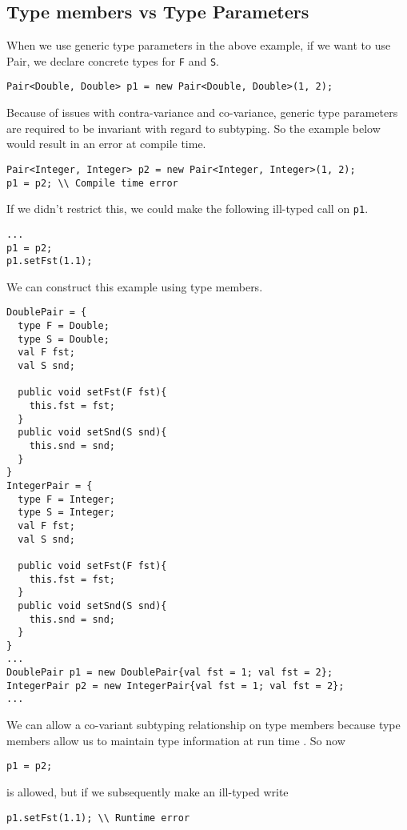 \documentclass{llncs}
\numberwithin{subcase}{casethm}
\numberwithin{casethm}{theorem}
\numberwithin{casethm}{lemma}
\begin{document}
\subsection{Type members vs Type Parameters}
When we use generic type parameters in the above example, 
if we want to use Pair, we declare  
concrete types for \texttt{F} and \texttt{S}.
\begin{lstlisting}[mathescape, style=custom_lang]
Pair<Double, Double> p1 = new Pair<Double, Double>(1, 2);
\end{lstlisting}
Because of issues with contra-variance and co-variance, 
generic type parameters are required to be invariant with 
regard to subtyping. So the example below would result in 
an error at compile time. 
\begin{lstlisting}[mathescape, style=custom_lang]
Pair<Integer, Integer> p2 = new Pair<Integer, Integer>(1, 2);
p1 = p2; \\ Compile time error
\end{lstlisting}
If we didn't restrict this, we could make the following 
ill-typed call on \texttt{p1}.
\begin{lstlisting}[mathescape, style=custom_lang]
...
p1 = p2;
p1.setFst(1.1);
\end{lstlisting}
We can construct this example using type members.
\begin{lstlisting}[mathescape, style=custom_lang]
DoublePair = {
  type F = Double;
  type S = Double;
  val F fst;
  val S snd;

  public void setFst(F fst){
    this.fst = fst;
  }
  public void setSnd(S snd){
    this.snd = snd;
  }
}
IntegerPair = {
  type F = Integer;
  type S = Integer;
  val F fst;
  val S snd;

  public void setFst(F fst){
    this.fst = fst;
  }
  public void setSnd(S snd){
    this.snd = snd;
  }
}
...
DoublePair p1 = new DoublePair{val fst = 1; val fst = 2};
IntegerPair p2 = new IntegerPair{val fst = 1; val fst = 2};
...
\end{lstlisting}
We can allow a co-variant subtyping relationship 
on type members because type members allow us to 
maintain type information at run time \cite{Bruce:1998}. So now %
\begin{lstlisting}[mathescape, style=custom_lang]
p1 = p2;
\end{lstlisting}
is allowed, but if we subsequently make an ill-typed 
write
\begin{lstlisting}[mathescape, style=custom_lang]
p1.setFst(1.1); \\ Runtime error
\end{lstlisting}
\end{document}
